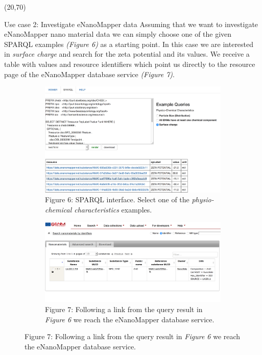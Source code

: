 \documentclass[final]{beamer}
\begin{document}
\begin{frame}{}
        
    \begin{textblock}{62}(20,70)
      \justifying
      \begin{block}{Use case 2: Investigate eNanoMapper data}
        Assuming that we want to investigate eNanoMapper nano material data we can simply choose one of the given SPARQL examples \emph{(Figure 6)} as a starting point. In this case we are interested in \emph{surface charge} and search for the zeta potential and its values. We receive a table with values and resource identifiers which point us directly to the resource page of the eNanoMapper database service \emph{(Figure 7)}.
        \begin{figure}
          \vspace{0.01\textwidth}
          \hspace{-0.15\textwidth}
          \begin{subfigure}[c]{0.35\textwidth}
            \includegraphics[scale=0.75,keepaspectratio]{onto-use-case-2a.png}
            \caption{Figure 6: SPARQL interface. Select one of the \emph{physio-chemical characteristics} examples.}
          \end{subfigure}
          \hspace{0.12\textwidth}
          \begin{subfigure}[c]{0.35\textwidth}
            \vspace{0.1\textwidth}
            \includegraphics[scale=0.75,keepaspectratio]{onto-use-case-2b.png}
            \caption{Figure 7: Following a link from the query result in \emph{Figure 6} we reach the eNanoMapper database service.}
          \end{subfigure}
        \end{figure}
      \end{block}
    \end{textblock}
    

\end{frame}
\end{document}
